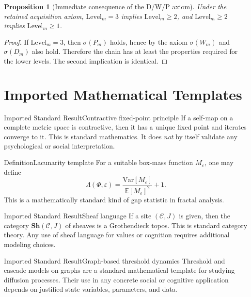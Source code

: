 \documentclass[11pt]{article}
\newcommand{\Frac}{\Phi}
\newcommand{\Lacunarity}{\Lambda}
\newcommand{\Sh}{\mathbf{Sh}}
\theoremstyle{plain}
\newtheorem{proposition}{Proposition}
\begin{document}
\begin{proposition}[Immediate consequence of the D/W/P axiom]
Under the retained acquisition axiom, $\mathrm{Level}_m=3$ implies
$\mathrm{Level}_m\ge 2$, and $\mathrm{Level}_m\ge 2$ implies
$\mathrm{Level}_m\ge 1$.
\end{proposition}

\begin{proof}
If $\mathrm{Level}_m=3$, then $\sigma(P_m)$ holds, hence by the axiom
$\sigma(W_m)$ and $\sigma(D_m)$ also hold. Therefore the chain has at least the
properties required for the lower levels. The second implication is identical.
\end{proof}

\section{Imported Mathematical Templates}

\begin{claimbox}{Imported Standard Result}{Contractive fixed-point principle}
If a self-map on a complete metric space is contractive, then it has a unique
fixed point and iterates converge to it. This is standard mathematics. It does
\emph{not} by itself validate any psychological or social interpretation.
\end{claimbox}

\begin{claimbox}{Definition}{Lacunarity template}
For a suitable box-mass function $M_\varepsilon$, one may define
\[
\Lacunarity(\Frac,\varepsilon)
= \frac{\mathrm{Var}[M_\varepsilon]}{\mathbb{E}[M_\varepsilon]^2}+1.
\]
This is a mathematically standard kind of gap statistic in fractal analysis.
\end{claimbox}

\begin{claimbox}{Imported Standard Result}{Sheaf language}
If a site $(\mathcal{C},J)$ is given, then the category $\Sh(\mathcal{C},J)$ of
sheaves is a Grothendieck topos. This is standard category theory. Any use of
sheaf language for values or cognition requires additional modeling choices.
\end{claimbox}

\begin{claimbox}{Imported Standard Result}{Graph-based threshold dynamics}
Threshold and cascade models on graphs are a standard mathematical template for
studying diffusion processes. Their use in any concrete social or cognitive
application depends on justified state variables, parameters, and data.
\end{claimbox}
\end{document}
